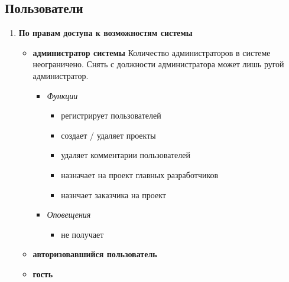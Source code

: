 \documentclass[14pt,a4paper]{extarticle}
\begin{document}
	\subsection {\bf Пользователи}
	\begin{enumerate}
		\item {\bf По правам доступа к возможностям системы}
		\begin{itemize}
			\item {\bf администратор системы}
			Количество администраторов в системе неограничено. Снять с должности администратора может лишь ругой администратор.
			\begin{itemize}
				\item {\it Функции}
				\begin{itemize}
					\item регистрирует пользователей
					\item создает / удаляет проекты
					\item удаляет комментарии пользователей
					\item назначает на проект главных разработчиков
					\item назнчает заказчика на проект
				\end{itemize}
				
				\item {\it Оповещения}
				\begin{itemize}
					\item не получает
				\end{itemize}
			\end{itemize}
			
			\item {\bf авторизовавшийся пользователь}
			
			\item {\bf гость}
			
		\end{itemize}
		

\end{enumerate}
\end{document}
